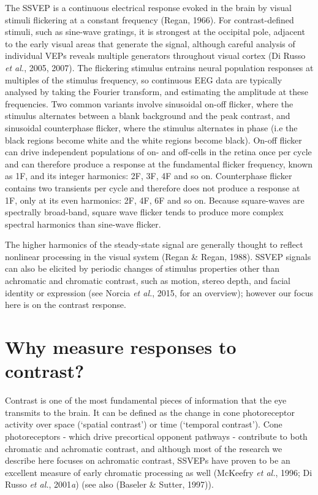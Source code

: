 \documentclass[
  letterpaper,
  DIV=11,
  numbers=noendperiod]{scrartcl}
\begin{document}
The SSVEP is a continuous electrical response evoked in the brain by
visual stimuli flickering at a constant frequency (Regan, 1966). For
contrast-defined stimuli, such as sine-wave gratings, it is strongest at
the occipital pole, adjacent to the early visual areas that generate the
signal, although careful analysis of individual VEPs reveals multiple
generators throughout visual cortex (Di Russo \emph{et al.}, 2005,
2007). The flickering stimulus entrains neural population responses at
multiples of the stimulus frequency, so continuous EEG data are
typically analysed by taking the Fourier transform, and estimating the
amplitude at these frequencies. Two common variants involve sinusoidal
on-off flicker, where the stimulus alternates between a blank background
and the peak contrast, and sinusoidal counterphase flicker, where the
stimulus alternates in phase (i.e the black regions become white and the
white regions become black). On-off flicker can drive independent
populations of on- and off-cells in the retina once per cycle and can
therefore produce a response at the fundamental flicker frequency, known
as 1F, and its integer harmonics: 2F, 3F, 4F and so on. Counterphase
flicker contains two transients per cycle and therefore does not produce
a response at 1F, only at its even harmonics: 2F, 4F, 6F and so on.
Because square-waves are spectrally broad-band, square wave flicker
tends to produce more complex spectral harmonics than sine-wave flicker.

The higher harmonics of the steady-state signal are generally thought to
reflect nonlinear processing in the visual system (Regan \& Regan,
1988). SSVEP signals can also be elicited by periodic changes of
stimulus properties other than achromatic and chromatic contrast, such
as motion, stereo depth, and facial identity or expression (see Norcia
\emph{et al.}, 2015, for an overview); however our focus here is on the
contrast response.

\section{Why measure responses to
contrast?}\label{why-measure-responses-to-contrast}

Contrast is one of the most fundamental pieces of information that the
eye transmits to the brain. It can be defined as the change in cone
photoreceptor activity over space (`spatial contrast') or time
(`temporal contrast'). Cone photoreceptors - which drive precortical
opponent pathways - contribute to both chromatic and achromatic
contrast, and although most of the research we describe here focuses on
achromatic contrast, SSVEPs have proven to be an excellent measure of
early chromatic processing as well (McKeefry \emph{et al.}, 1996; Di
Russo \emph{et al.}, 2001\emph{a}) (see also (Baseler \& Sutter, 1997)).
\end{document}
